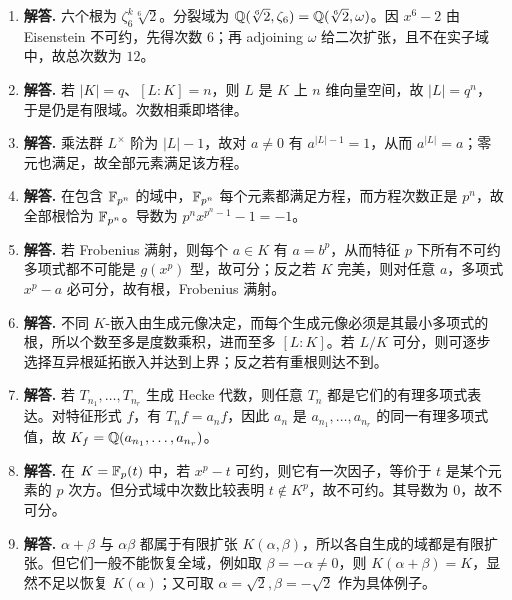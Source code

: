 \begin{enumerate}[label=\textbf{\arabic*.}, leftmargin=*, itemsep=1em]
\item \textbf{解答.} 六个根为 $\zeta_6^k\sqrt[6]{2}$。分裂域为 $\mathbb{Q}(\sqrt[6]{2},\zeta_6)=\mathbb{Q}(\sqrt[6]{2},\omega)$。因 $x^6-2$ 由 Eisenstein 不可约，先得次数 $6$；再 adjoining $\omega$ 给二次扩张，且不在实子域中，故总次数为 $12$。
\item \textbf{解答.} 若 $|K|=q$、$[L:K]=n$，则 $L$ 是 $K$ 上 $n$ 维向量空间，故 $|L|=q^n$，于是仍是有限域。次数相乘即塔律。
\item \textbf{解答.} 乘法群 $L^\times$ 阶为 $|L|-1$，故对 $a\ne0$ 有 $a^{|L|-1}=1$，从而 $a^{|L|}=a$；零元也满足，故全部元素满足该方程。
\item \textbf{解答.} 在包含 $\mathbb{F}_{p^n}$ 的域中，$\mathbb{F}_{p^n}$ 每个元素都满足方程，而方程次数正是 $p^n$，故全部根恰为 $\mathbb{F}_{p^n}$。导数为 $p^n x^{p^n-1}-1=-1$。
\item \textbf{解答.} 若 Frobenius 满射，则每个 $a\in K$ 有 $a=b^p$，从而特征 $p$ 下所有不可约多项式都不可能是 $g(x^p)$ 型，故可分；反之若 $K$ 完美，则对任意 $a$，多项式 $x^p-a$ 必可分，故有根，Frobenius 满射。
\item \textbf{解答.} 不同 $K$-嵌入由生成元像决定，而每个生成元像必须是其最小多项式的根，所以个数至多是度数乘积，进而至多 $[L:K]$。若 $L/K$ 可分，则可逐步选择互异根延拓嵌入并达到上界；反之若有重根则达不到。
\item \textbf{解答.} 若 $T_{n_1},\dots,T_{n_r}$ 生成 Hecke 代数，则任意 $T_n$ 都是它们的有理多项式表达。对特征形式 $f$，有 $T_n f=a_nf$，因此 $a_n$ 是 $a_{n_1},\dots,a_{n_r}$ 的同一有理多项式值，故 $K_f=\mathbb{Q}(a_{n_1},\dots,a_{n_r})$。
\item \textbf{解答.} 在 $K=\mathbb{F}_p(t)$ 中，若 $x^p-t$ 可约，则它有一次因子，等价于 $t$ 是某个元素的 $p$ 次方。但分式域中次数比较表明 $t\notin K^p$，故不可约。其导数为 $0$，故不可分。
\item \textbf{解答.} $\alpha+\beta$ 与 $\alpha\beta$ 都属于有限扩张 $K(\alpha,\beta)$，所以各自生成的域都是有限扩张。但它们一般不能恢复全域，例如取 $\beta=-\alpha\ne0$，则 $K(\alpha+\beta)=K$，显然不足以恢复 $K(\alpha)$；又可取 $\alpha=\sqrt2,\beta=-\sqrt2$ 作为具体例子。
\end{enumerate}
